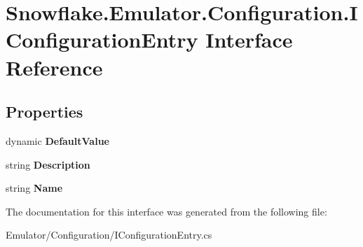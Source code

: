 \hypertarget{interface_snowflake_1_1_emulator_1_1_configuration_1_1_i_configuration_entry}{}\section{Snowflake.\+Emulator.\+Configuration.\+I\+Configuration\+Entry Interface Reference}
\label{interface_snowflake_1_1_emulator_1_1_configuration_1_1_i_configuration_entry}
\subsection*{Properties}
\begin{DoxyCompactItemize}
\item 
\hypertarget{interface_snowflake_1_1_emulator_1_1_configuration_1_1_i_configuration_entry_acf80c7f8c328b82ae76ee041fdcda8ab}{}dynamic {\bfseries Default\+Value}\label{interface_snowflake_1_1_emulator_1_1_configuration_1_1_i_configuration_entry_acf80c7f8c328b82ae76ee041fdcda8ab}

\item 
\hypertarget{interface_snowflake_1_1_emulator_1_1_configuration_1_1_i_configuration_entry_a3186f524869e64f7d5e9e809036fd51e}{}string {\bfseries Description}\label{interface_snowflake_1_1_emulator_1_1_configuration_1_1_i_configuration_entry_a3186f524869e64f7d5e9e809036fd51e}

\item 
\hypertarget{interface_snowflake_1_1_emulator_1_1_configuration_1_1_i_configuration_entry_a5c6d89feabf5c5662cb2d967506ca236}{}string {\bfseries Name}\label{interface_snowflake_1_1_emulator_1_1_configuration_1_1_i_configuration_entry_a5c6d89feabf5c5662cb2d967506ca236}

\end{DoxyCompactItemize}


The documentation for this interface was generated from the following file\+:\begin{DoxyCompactItemize}
\item 
Emulator/\+Configuration/I\+Configuration\+Entry.\+cs\end{DoxyCompactItemize}
